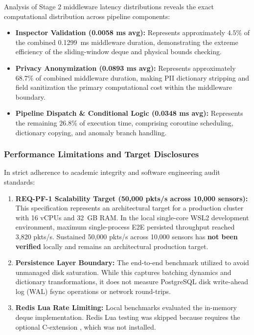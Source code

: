 \documentclass[a4paper]{article}
\begin{document}
Analysis of Stage 2 middleware latency distributions reveals the exact computational distribution across pipeline components:
\begin{itemize}
    \item \textbf{Inspector Validation (0.0058 ms avg):} Represents approximately $4.5\%$ of the combined 0.1299~ms middleware duration, demonstrating the extreme efficiency of the sliding-window deque and physical bounds checking.
    \item \textbf{Privacy Anonymization (0.0893 ms avg):} Represents approximately $68.7\%$ of combined middleware duration, making PII dictionary stripping and field sanitization the primary computational cost within the middleware boundary.
    \item \textbf{Pipeline Dispatch \& Conditional Logic (0.0348 ms avg):} Represents the remaining $26.8\%$ of execution time, comprising coroutine scheduling, dictionary copying, and anomaly branch handling.
\end{itemize}

\subsubsection{Performance Limitations and Target Disclosures}
In strict adherence to academic integrity and software engineering audit standards:
\begin{enumerate}
    \item \textbf{REQ-PF-1 Scalability Target (50,000 pkts/s across 10,000 sensors):} This specification represents an architectural target for a production cluster with 16 vCPUs and 32~GB RAM. In the local single-core WSL2 development environment, maximum single-process E2E persisted throughput reached 3,820 pkts/s. Sustained 50,000 pkts/s across 10,000 sensors has \textbf{not been verified} locally and remains an architectural production target.
    \item \textbf{Persistence Layer Boundary:} The end-to-end benchmark utilized  to avoid unmanaged disk saturation. While this captures batching dynamics and dictionary transformations, it does not measure PostgreSQL disk write-ahead log (WAL) fsync operations or network round-trips.
    \item \textbf{Redis Lua Rate Limiting:} Local benchmarks evaluated the in-memory deque implementation. Redis Lua testing was skipped because  requires the optional C-extension , which was not installed.
\end{enumerate}
\end{document}
